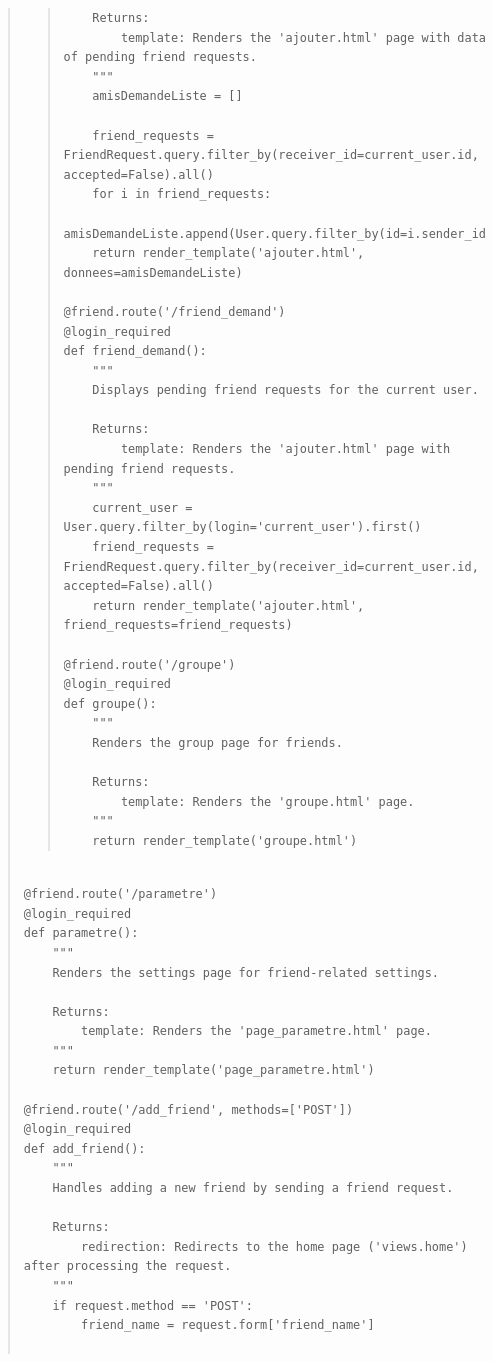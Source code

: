 \documentclass{article}
\begin{document}
\begin{quote}
\begin{quote}
\begin{tcolorbox}[colback=grisClair,colframe=black]
\begin{lstlisting}
    Returns:
        template: Renders the 'ajouter.html' page with data of pending friend requests.
    """
    amisDemandeListe = []

    friend_requests = FriendRequest.query.filter_by(receiver_id=current_user.id, accepted=False).all()
    for i in friend_requests:
        amisDemandeListe.append(User.query.filter_by(id=i.sender_id).first())
    return render_template('ajouter.html', donnees=amisDemandeListe)

@friend.route('/friend_demand')
@login_required
def friend_demand():
    """
    Displays pending friend requests for the current user.

    Returns:
        template: Renders the 'ajouter.html' page with pending friend requests.
    """
    current_user = User.query.filter_by(login='current_user').first()
    friend_requests = FriendRequest.query.filter_by(receiver_id=current_user.id, accepted=False).all()
    return render_template('ajouter.html', friend_requests=friend_requests)

@friend.route('/groupe')
@login_required
def groupe():
    """
    Renders the group page for friends.

    Returns:
        template: Renders the 'groupe.html' page.
    """
    return render_template('groupe.html')
                    \end{lstlisting}       
                \end{tcolorbox}

    \end{quote}




    \begin{tcolorbox}[colback=grisClair,colframe=black]
        \begin{lstlisting}

@friend.route('/parametre')
@login_required
def parametre():
    """
    Renders the settings page for friend-related settings.

    Returns:
        template: Renders the 'page_parametre.html' page.
    """
    return render_template('page_parametre.html')

@friend.route('/add_friend', methods=['POST'])
@login_required
def add_friend():
    """
    Handles adding a new friend by sending a friend request.

    Returns:
        redirection: Redirects to the home page ('views.home') after processing the request.
    """
    if request.method == 'POST':
        friend_name = request.form['friend_name']


\end{lstlisting}
\end{tcolorbox}
\end{quote}
\end{document}
